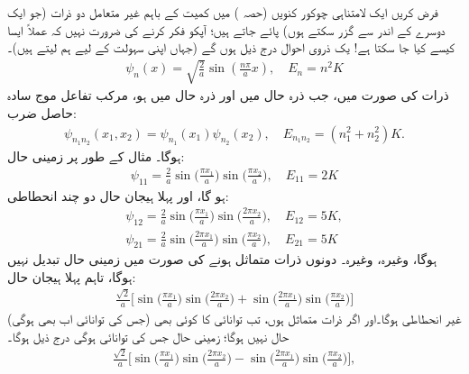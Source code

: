 

فرض کریں ایک لامتناہی چوکور کنویں (حصہ ) میں کمیت  کے باہم غیر متعامل دو ذرات (جو ایک دوسرے کے اندر سے گزر سکتے ہوں) پائے جاتے ہیں؛ آپکو فکر کرنے کی ضرورت نہیں کہ عملاً ایسا کیسے کیا جا سکتا ہے! یک ذروی احوال درج ذیل ہوں گے (جہاں اپنی سہولت کے لیے ہم  لیتے ہیں)۔
\begin{align*}
 \psi_{n} (x)=\sqrt{\frac{2}{a}}\sin(\tfrac{n \pi}{a}x), \quad E_{n}=n^2 K 
\end{align*}
 ذرات کی صورت میں، جب ذرہ  حال  میں اور ذرہ  حال  میں ہو، مرکب تفاعل موج سادہ حاصل ضرب:
\begin{align*}
 \psi_{n_{1} n_{2}} (x_{1},x_{2})=\psi_{n_{1}}(x_{1})\psi_{n_{2}}(x_{2}), \quad E_{n_{1} n_{2}}= (n_{1}^2+n_{2}^2)K. 
\end{align*}
 ہوگا۔ مثال کے طور پر زمینی حال:
\begin{align*}
 \psi_{11}=\frac{2}{a}\sin\big(\frac{\pi x_{1}}{a}\big) \sin\big(\frac{\pi x_{2}}{a}\big), \quad E_{11}=2K
\end{align*}
ہو گا، اور پہلا ہیجان حال دو چند انحطاطی:
\begin{align*}
 \psi_{12}=\frac{2}{a}\sin\big(\frac{\pi x_{1}}{a}\big) \sin\big(\frac{2\pi x_{2}}{a}\big), \quad E_{12}=5K, \\
\psi_{21}=\frac{2}{a}\sin\big(\frac{2\pi x_{1}}{a}\big) \sin\big(\frac{\pi x_{2}}{a}\big), \quad E_{21}=5K
\end{align*}
ہوگا، وغیرہ، وغیرہ۔ دونوں ذرات متماثل ہونے کی صورت میں زمینی حال تبدیل نہیں ہوگا، تاہم پہلا ہیجان حال:
\begin{align*}
\frac{\sqrt{2}}{a}\big[\sin\big(\frac{\pi x_{1}}{a}\big)\sin\big(\frac{2\pi x_{2}}{a}\big)+ \sin\big(\frac{2 \pi x_{1}}{a}\big)\sin\big(\frac{\pi x_{2}}{a}\big)\big]
\end{align*} 
 (جس کی توانائی اب بھی  ہوگی) غیر انحطاطی ہوگا۔اور اگر ذرات متماثل  ہوں، تب  توانائی کا کوئی بھی حال نہیں ہوگا؛ زمینی حال جس کی توانائی  ہوگی درج ذیل ہوگا۔
\begin{align*}
\frac{\sqrt{2}}{a}\big[\sin\big(\frac{\pi x_{1}}{a}\big) \sin\big(\frac{2 \pi x_{2}}{a}\big)- \sin\big(\frac{2 \pi x_{1}}{a}\big) \sin\big(\frac{\pi x_{2}}{a}\big)\big], 
\end{align*}
